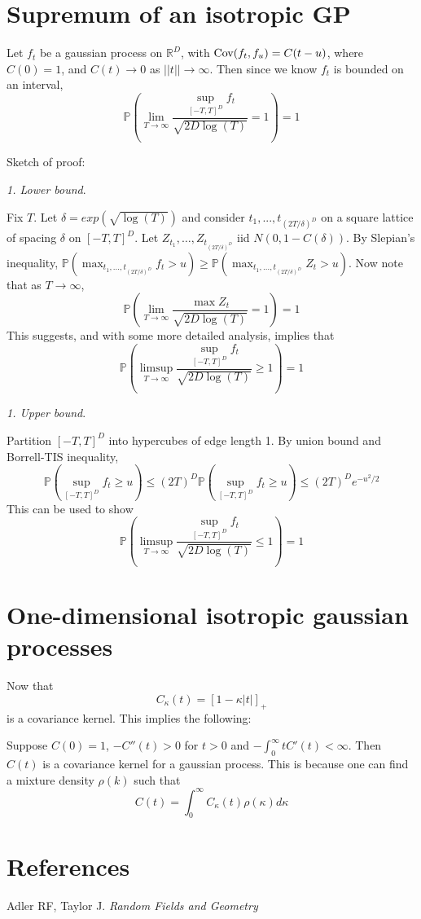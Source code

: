 \documentclass[11pt]{article}
\begin{document}
\section{Supremum of an isotropic GP}

Let $f_t$ be a gaussian process on $\mathbb{R}^D$, with $\text{Cov}(f_t,f_u)
= C(t-u)$, where $C(0) = 1$, and $C(t) \to 0$ as $||t|| \to \infty$.
Then since we know $f_t$ is bounded on an interval,
\[
\mathbb{P}\left(\lim_{T \to \infty}\frac{\sup_{[-T,T]^D}
    f_t}{\sqrt{2D\log(T)}} = 1
\right) = 1
\]

Sketch of proof:

\emph{1. Lower bound}.

Fix $T$. Let $\delta =exp(\sqrt{\log(T)})$ and consider
$t_1,...,t_{(2T/\delta)^D}$ on a square lattice of spacing $\delta$ on
$[-T,T]^D$.  Let $Z_{t_1},\hdots, Z_{t_{(2T/\delta)^D}}$ iid
$N(0,1-C(\delta))$.  By Slepian's inequality,
$\mathbb{P}(\max_{t_1,\hdots,t_{(2T/\delta)^D}} f_t > u) \geq
\mathbb{P}(\max_{t_1,\hdots,t_{(2T/\delta)^D}} Z_t > u)$.  Now note
that as $T \to \infty$, 
\[
\mathbb{P}\left(\lim_{T \to \infty}\frac{\max
    Z_t}{\sqrt{2D\log(T)}} = 1
\right) = 1
\]
This suggests, and with some more detailed analysis, implies that
\[
\mathbb{P}\left(\limsup_{T \to \infty}\frac{\sup_{[-T,T]^D}
    f_t}{\sqrt{2D\log(T)}} \geq 1
\right) = 1
\]

\emph{1. Upper bound}.

Partition $[-T,T]^D$ into hypercubes of edge length 1.
By union bound and Borrell-TIS inequality,
\[\mathbb{P}(\sup_{[-T,T]^D} f_t \geq u) \leq (2T)^D
\mathbb{P}(\sup_{[-T,T]^D} f_t \geq u) \leq (2T)^D e^{-u^2/2}\]
This can be used to show
\[
\mathbb{P}\left(\limsup_{T \to \infty}\frac{\sup_{[-T,T]^D}
    f_t}{\sqrt{2D\log(T)}} \leq 1
\right) = 1
\]

\section{One-dimensional isotropic gaussian processes}

Now that 
\[
C_\kappa(t) = [1-\kappa|t|]_+
\]
is a covariance kernel. This implies the following:

Suppose $C(0) = 1$, $-C''(t) > 0$ for $t > 0$ and $-\int_0^\infty t
C'(t) <\infty$.
Then $C(t)$ is a covariance kernel for a gaussian process.
This is because one can find a mixture density $\rho(k)$ such that
\[
C(t) = \int_0^\infty C_\kappa(t) \rho(\kappa) d\kappa
\]



\section{References}

Adler RF, Taylor J. \emph{Random Fields and Geometry}
\end{document}
